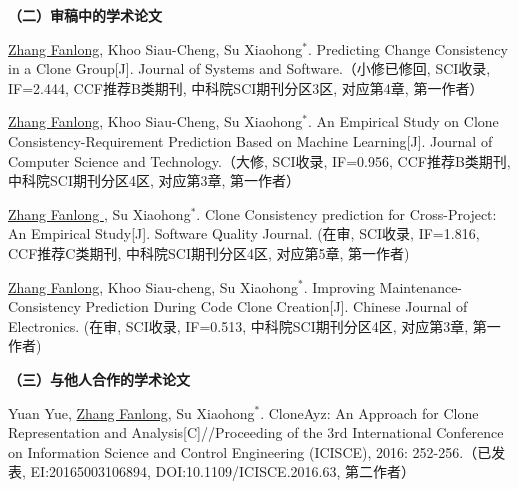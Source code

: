 \noindent\textbf{（二）审稿中的学术论文}
\begin{publist}

\item
\underline{Zhang Fanlong}, Khoo Siau-Cheng, Su Xiaohong{$^*$}. Predicting Change Consistency in a Clone Group[J]. Journal of Systems and Software.（小修已修回, SCI收录, IF=2.444, CCF推荐B类期刊, 中科院SCI期刊分区3区, 对应第4章, 第一作者）

\item
\underline{Zhang Fanlong},  Khoo Siau-Cheng, Su Xiaohong{$^*$}. An Empirical Study on Clone Consistency-Requirement Prediction Based on Machine Learning[J]. Journal of Computer Science and Technology.（大修, SCI收录, IF=0.956, CCF推荐B类期刊, 中科院SCI期刊分区4区, 对应第3章, 第一作者）

\item
\underline{Zhang Fanlong }, Su Xiaohong{$^*$}. Clone Consistency prediction for Cross-Project: An Empirical Study[J]. Software Quality Journal. (在审, SCI收录, IF=1.816, CCF推荐C类期刊, 中科院SCI期刊分区4区, 对应第5章, 第一作者)

\item
\underline{Zhang Fanlong}, Khoo Siau-cheng, Su Xiaohong{$^*$}. Improving Maintenance-Consistency Prediction During Code Clone Creation[J]. Chinese Journal of Electronics. (在审, SCI收录, IF=0.513, 中科院SCI期刊分区4区, 对应第3章, 第一作者)

\end{publist}

\noindent\textbf{（三）与他人合作的学术论文}
\begin{publist}
\item
Yuan Yue, \underline{Zhang Fanlong},  Su Xiaohong{$^*$}. CloneAyz: An Approach for Clone Representation and Analysis[C]//Proceeding of the 3rd International Conference on Information Science and Control Engineering (ICISCE), 2016: 252-256.（已发表, EI:20165003106894, DOI:10.1109/ICISCE.2016.63, 第二作者）
\end{publist}




